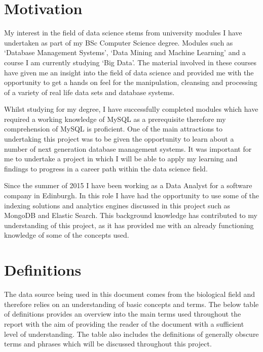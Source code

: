 \section{Motivation}
My interest in the field of data science stems from university modules I have undertaken as part of my BSc Computer Science degree. Modules such as `Database Management Systems', `Data Mining and Machine Learning' and a course I am currently studying `Big Data'. The material involved in these courses have given me an insight into the field of data science and provided me with the opportunity to get a hands on feel for the manipulation, cleansing and processing of a variety of real life data sets and database systems.

Whilst studying for my degree, I have successfully completed modules which have required a working knowledge of MySQL as a prerequisite therefore my comprehension of MySQL is proficient. One of the main attractions to undertaking this project was to be given the opportunity to learn about a number of next generation database management systems. It was important for me to undertake a project in which I will be able to apply my learning and findings to progress in a career path within the data science field.

Since the summer of 2015 I have been working as a Data Analyst for a software company in Edinburgh. In this role I have had the opportunity to use some of the indexing solutions and analytics engines discussed in this project such as MongoDB and Elastic Search. This background knowledge has contributed to my understanding of this project, as it has provided me with an already functioning knowledge of some of the concepts used.

\section{Definitions}
The data source being used in this document comes from the biological field and therefore relies on an understanding of basic concepts and terms. The below table of definitions provides an overview into the main terms used throughout the report with the aim of providing the reader of the document with a sufficient level of understanding. The table also includes the definitions of generally obscure terms and phrases which will be discussed throughout this project.

